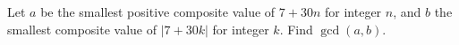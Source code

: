 Let $a$ be the smallest positive composite value of $7+30n$ for integer $n$, and $b$ the smallest composite value of $|7+30k|$ for integer $k$. Find $\gcd(a,b)$.
